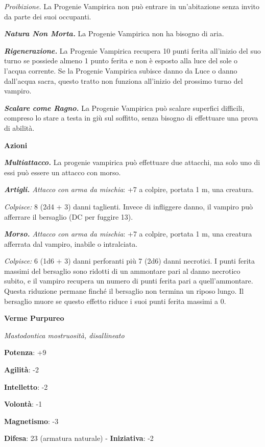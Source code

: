 \begin{multicols}{2}
\emph{Proibizione.} La Progenie Vampirica non può entrare in
un'abitazione senza invito da parte dei suoi occupanti.

\emph{\textbf{Natura Non Morta.}} La Progenie Vampirica non ha bisogno
di aria.

\emph{\textbf{Rigenerazione.}} La Progenie Vampirica recupera 10 punti
ferita all'inizio del suo turno se possiede almeno 1 punto ferita e non
è esposto alla luce del sole o l'acqua corrente. Se la Progenie
Vampirica subisce danno da Luce o danno dall'acqua sacra, questo tratto
non funziona all'inizio del prossimo turno del vampiro.

\emph{\textbf{Scalare come Ragno.}} La Progenie Vampirica può scalare
superfici difficili, compreso lo stare a testa in giù sul soffitto,
senza bisogno di effettuare una prova di abilità.

\smallskip\textbf{Azioni}

\emph{\textbf{Multiattacco.}} La progenie vampirica può effettuare due
attacchi, ma solo uno di essi può essere un attacco con morso.

\emph{\textbf{Artigli.} Attacco con arma da mischia}: +7 a colpire,
portata 1 m, una creatura.

\emph{Colpisce:} 8 (2d4 + 3) danni taglienti. Invece di infliggere
danno, il vampiro può afferrare il bersaglio (DC per fuggire 13).

\emph{\textbf{Morso.} Attacco con arma da mischia}: +7 a colpire,
portata 1 m, una creatura afferrata dal vampiro, inabile o
intralciata.

\emph{Colpisce:} 6 (1d6 + 3) danni perforanti più 7 (2d6) danni
necrotici. I punti ferita massimi del bersaglio sono ridotti di un
ammontare pari al danno necrotico subito, e il vampiro recupera un
numero di punti ferita pari a quell'ammontare. Questa riduzione permane
finché il bersaglio non termina un riposo lungo. Il bersaglio muore se
questo effetto riduce i suoi punti ferita massimi a 0.

\textbf{Verme Purpureo}

\emph{Mastodontica mostruosità, disallineato}

\textbf{Potenza}: +9

\textbf{Agilità}: -2

\textbf{Intelletto}: -2

\textbf{Volontà}: -1

\textbf{Magnetismo}: -3

\textbf{Difesa}: 23 (armatura naturale) - \textbf{Iniziativa}: -2


\end{multicols}
